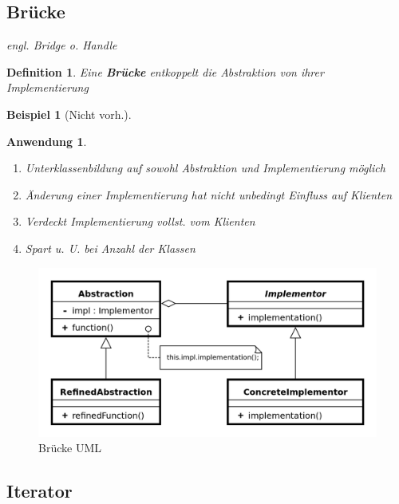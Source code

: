 \documentclass[a4paper]{article}
\theoremstyle{break}
\newtheorem{defi}{Definition}[section]
\newtheorem{ex}{Beispiel}[section]
\newtheorem{why}{Anwendung}[section]
\begin{document}
\newpage
\subsection{Brücke}
\textit{engl. Bridge o. Handle}
\begin{defi}
	Eine \textbf{Brücke} entkoppelt die Abstraktion von ihrer Implementierung
\end{defi}
\begin{ex}[Nicht vorh.]
\end{ex}
\begin{why}
	\begin{enumerate}
		\item Unterklassenbildung auf sowohl Abstraktion und Implementierung möglich
		\item Änderung einer Implementierung hat nicht unbedingt Einfluss auf Klienten
		\item Verdeckt Implementierung vollst. vom Klienten
		\item Spart u. U. bei Anzahl der Klassen
	\end{enumerate}
\end{why}
\begin{figure}[H]
	\centering
	\includegraphics[width=\textwidth]{../diagrams/uml/BridgePattern.png}
	\caption{Brücke UML}
\end{figure}

\newpage
\subsection{Iterator}
\end{document}
